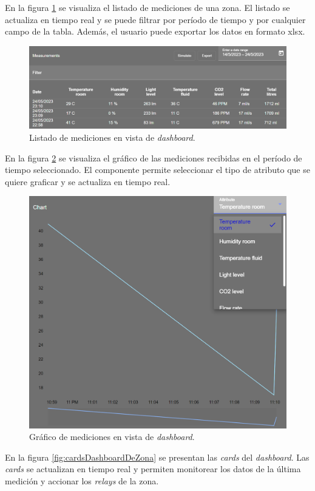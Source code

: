 En la figura \ref{fig:tablaMedicionesDashboardDeZona} se visualiza el listado de mediciones de una zona. El listado se actualiza en tiempo real y se puede filtrar por período de tiempo y por cualquier campo de la tabla. Además, el usuario puede exportar los datos en formato xlsx.

\begin{figure}[H]
	\centering
	\includegraphics[width=.9\textwidth]{./Figures/Frontend dashboard de zona tabla.png}
	\caption{Listado de mediciones en vista de \textit{dashboard}.}
	\label{fig:tablaMedicionesDashboardDeZona}
\end{figure}

En la figura \ref{fig:graficoMedicionesDashboardDeZona} se visualiza el gráfico de las mediciones recibidas en el período de tiempo seleccionado. El componente permite seleccionar el tipo de atributo que se quiere graficar y se actualiza en tiempo real.

\begin{figure}[H]
	\centering
	\includegraphics[width=.7\textwidth]{./Figures/Frontend dashboard de zona grafico.png}
	\caption{Gráfico de mediciones en vista de \textit{dashboard}.}
	\label{fig:graficoMedicionesDashboardDeZona}
\end{figure}

En la figura \ref{fig:cardsDashboardDeZona} se presentan las \emph{cards} del \emph{dashboard}. Las \textit{cards} se actualizan en tiempo real y permiten monitorear los datos de la última medición y accionar los \textit{relays} de la zona. 

